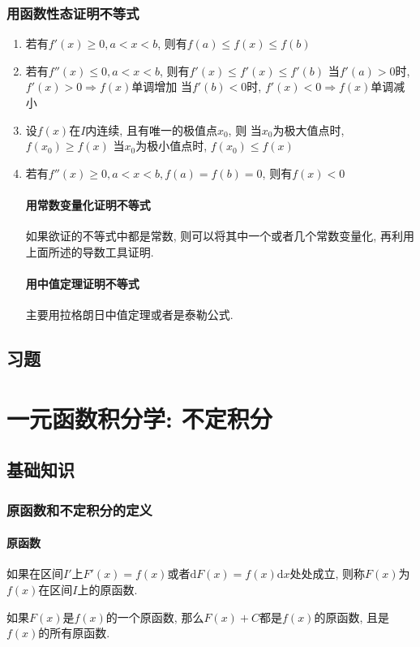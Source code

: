 \subsection{用函数性态证明不等式}
\begin{enumerate}
\item 若有$ f'(x)\ge 0, a<x<b $, 则有$ f(a)\le f(x)\le f(b) $
\item 若有$ f''(x)\le 0, a<x<b $, 则有$ f'(x)\le f'(x)\le f'(b) $
\subitem 当$ f'(a)>0 $时, $ f'(x)>0\Rightarrow f(x) $单调增加
\subitem 当$ f'(b)<0 $时, $ f'(x)<0\Rightarrow f(x) $单调减小
\item 设$ f(x) $在$ I $内连续, 且有唯一的极值点$ x_{0} $, 则
\subitem 当$ x_{0} $为极大值点时, $ f(x_{0})\ge f(x) $
\subitem 当$ x_{0} $为极小值点时, $ f(x_{0})\le f(x) $
\item 若有$ f''(x)\ge 0, a<x<b, f(a)=f(b)=0 $, 则有$ f(x)<0 $
\subsubsection{用常数变量化证明不等式}
如果欲证的不等式中都是常数, 则可以将其中一个或者几个常数变量化, 再利用上面所述的导数工具证明.
\subsubsection{用中值定理证明不等式}
主要用拉格朗日中值定理或者是泰勒公式.
\end{enumerate}
\section{习题}
\chapter{一元函数积分学: 不定积分}
\section{基础知识}
\subsection{原函数和不定积分的定义}
\subsubsection{原函数}
如果在区间$ I' $上$ F'(x)=f(x) $或者$ \mathrm{d}F(x)=f(x)\mathrm{d}x $处处成立, 则称$ F(x) $为$ f(x) $在区间$ I $上的原函数.
\begin{tcolorbox}
如果$ F(x) $是$ f(x) $的一个原函数, 那么$ F(x)+C $都是$ f(x) $的原函数, 且是$ f(x) $的所有原函数.
\end{tcolorbox}
